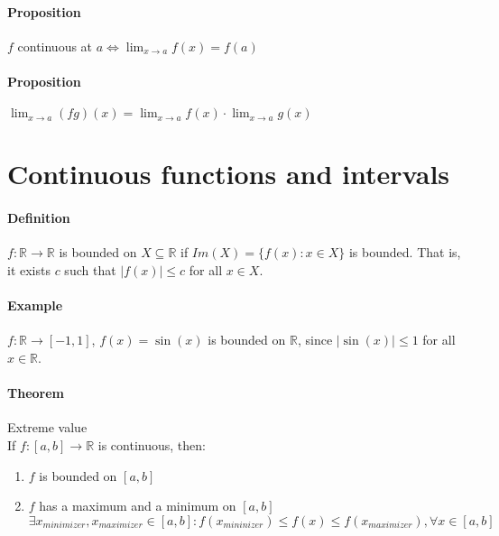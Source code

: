 \documentclass{article}
\newcommand{\abs}[1]{\left|#1\right|}
\newcommand{\func}[3]{#1 : #2 \rightarrow #3}
\newcommand{\functoR}[2]{#1 : #2 \rightarrow \mathbb{R}}
\newcommand{\funcR}[1]{#1 : \mathbb{R} \rightarrow \mathbb{R}}
\newcommand{\limx}[1]{\lim_{x \to #1}}
\newcommand{\intcc}[1]{\left[#1\right]}
\newcommand{\R}{\mathbb{R}}
\newcommand{\Def}{\paragraph{Definition}}
\newcommand{\Proposition}{\paragraph{Proposition}}
\newcommand{\Theorem}{\paragraph{Theorem}}
\newcommand{\Example}{\paragraph{Example}}
\begin{document}
  \Proposition $f$ continuous at $a \iff \limx{a} f(x) = f(a)$

  \Proposition $\limx{a} (fg)(x) = \limx{a} f(x) \cdot \limx{a} g(x)$

\section{Continuous functions and intervals}

  \Def $\funcR{f}$ is bounded on $X \subseteq \R$ if $Im(X) = \{ f(x) : x \in X
  \}$ is bounded. That is, it exists $c$ such that $\abs{f(x)} \leq c$ for all
  $x \in X$.

  \Example $\func{f}{\R}{\intcc{-1,1}}$, $f(x) = \sin(x)$ is bounded on $\R$,
  since $\abs{\sin(x)} \leq 1$ for all $x \in \R$.

  \Theorem Extreme value
\\If $\functoR{f}{\intcc{a,b}}$ is continuous, then:
  \begin{enumerate}[label=(\roman*)]
    \item $f$ is bounded on $\intcc{a,b}$
    \item $f$ has a maximum and a minimum on $\intcc{a,b}$
  \\$\exists x_{minimizer}, x_{maximizer} \in \intcc{a,b} :
  f(x_{mininizer}) \leq f(x) \leq f(x_{maximizer}), \forall x \in \intcc{a,b}$
  \end{enumerate}
\end{document}

